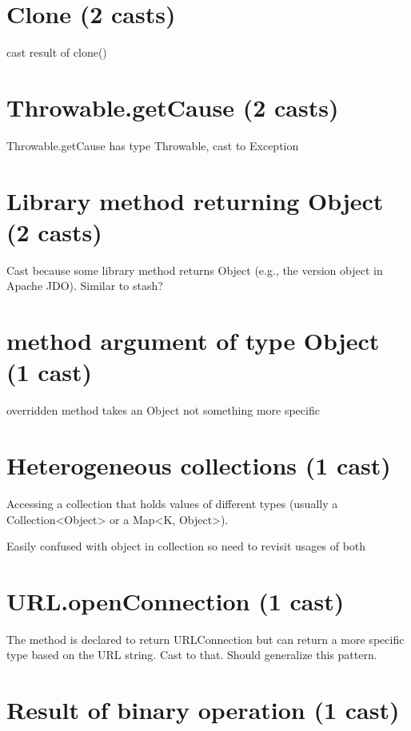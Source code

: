 \section{Clone (2 casts)}
\label{sec:org8983638}

cast result of clone() 

\section{Throwable.getCause (2 casts)}
\label{sec:org2605b45}

Throwable.getCause has type Throwable, cast to Exception 

\section{Library method returning Object (2 casts)}
\label{sec:orgf68c828}

Cast because some library method returns Object (e.g., the version object in Apache JDO). 
Similar to stash? 

\section{method argument of type Object (1 cast)}
\label{sec:org888d43c}

overridden method takes an Object not something more specific 

\section{Heterogeneous collections (1 cast)}
\label{sec:orga4b2a0d}

Accessing a collection that holds values of different types (usually a Collection<Object> or a Map<K, Object>). 

Easily confused with object in collection so need to revisit usages of both 

\section{URL.openConnection (1 cast)}
\label{sec:orgdc3f871}

The method is declared to return URLConnection but can return a more specific type based on the URL string. 
Cast to that. 
Should generalize this pattern. 

\section{Result of binary operation (1 cast)}
\label{sec:orgf0797dd}

